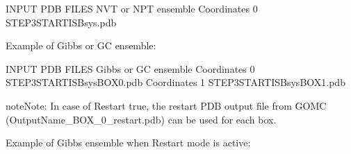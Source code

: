 \documentclass[letterpaper,10pt,english]{sphinxmanual}
\begin{document}
\begin{description}
%
\begin{sphinxVerbatim}[commandchars=\\\{\}]
\PYGZsh{}\PYGZsh{}\PYGZsh{}\PYGZsh{}\PYGZsh{}\PYGZsh{}\PYGZsh{}\PYGZsh{}\PYGZsh{}\PYGZsh{}\PYGZsh{}\PYGZsh{}\PYGZsh{}\PYGZsh{}\PYGZsh{}\PYGZsh{}\PYGZsh{}\PYGZsh{}\PYGZsh{}\PYGZsh{}\PYGZsh{}\PYGZsh{}\PYGZsh{}\PYGZsh{}\PYGZsh{}\PYGZsh{}\PYGZsh{}\PYGZsh{}\PYGZsh{}\PYGZsh{}\PYGZsh{}\PYGZsh{}\PYGZsh{}
\PYGZsh{} INPUT PDB FILES \PYGZhy{} NVT or NPT ensemble
\PYGZsh{}\PYGZsh{}\PYGZsh{}\PYGZsh{}\PYGZsh{}\PYGZsh{}\PYGZsh{}\PYGZsh{}\PYGZsh{}\PYGZsh{}\PYGZsh{}\PYGZsh{}\PYGZsh{}\PYGZsh{}\PYGZsh{}\PYGZsh{}\PYGZsh{}\PYGZsh{}\PYGZsh{}\PYGZsh{}\PYGZsh{}\PYGZsh{}\PYGZsh{}\PYGZsh{}\PYGZsh{}\PYGZsh{}\PYGZsh{}\PYGZsh{}\PYGZsh{}\PYGZsh{}\PYGZsh{}\PYGZsh{}\PYGZsh{}
Coordinates 0 STEP3\PYGZus{}START\PYGZus{}ISB\PYGZus{}sys.pdb
\end{sphinxVerbatim}

Example of Gibbs or GC ensemble:

%
\begin{sphinxVerbatim}[commandchars=\\\{\}]
\PYGZsh{}\PYGZsh{}\PYGZsh{}\PYGZsh{}\PYGZsh{}\PYGZsh{}\PYGZsh{}\PYGZsh{}\PYGZsh{}\PYGZsh{}\PYGZsh{}\PYGZsh{}\PYGZsh{}\PYGZsh{}\PYGZsh{}\PYGZsh{}\PYGZsh{}\PYGZsh{}\PYGZsh{}\PYGZsh{}\PYGZsh{}\PYGZsh{}\PYGZsh{}\PYGZsh{}\PYGZsh{}\PYGZsh{}\PYGZsh{}\PYGZsh{}\PYGZsh{}\PYGZsh{}\PYGZsh{}\PYGZsh{}\PYGZsh{}
\PYGZsh{} INPUT PDB FILES \PYGZhy{} Gibbs or GC ensemble
\PYGZsh{}\PYGZsh{}\PYGZsh{}\PYGZsh{}\PYGZsh{}\PYGZsh{}\PYGZsh{}\PYGZsh{}\PYGZsh{}\PYGZsh{}\PYGZsh{}\PYGZsh{}\PYGZsh{}\PYGZsh{}\PYGZsh{}\PYGZsh{}\PYGZsh{}\PYGZsh{}\PYGZsh{}\PYGZsh{}\PYGZsh{}\PYGZsh{}\PYGZsh{}\PYGZsh{}\PYGZsh{}\PYGZsh{}\PYGZsh{}\PYGZsh{}\PYGZsh{}\PYGZsh{}\PYGZsh{}\PYGZsh{}\PYGZsh{}
Coordinates 0 STEP3\PYGZus{}START\PYGZus{}ISB\PYGZus{}sys\PYGZus{}BOX\PYGZus{}0.pdb
Coordinates 1 STEP3\PYGZus{}START\PYGZus{}ISB\PYGZus{}sys\PYGZus{}BOX\PYGZus{}1.pdb
\end{sphinxVerbatim}

\begin{sphinxadmonition}{note}{Note:}
In case of Restart true, the restart PDB output file from GOMC (OutputName\_BOX\_0\_restart.pdb) can be used for each box.
\end{sphinxadmonition}

Example of Gibbs ensemble when Restart mode is active:


\end{description}
\end{document}
